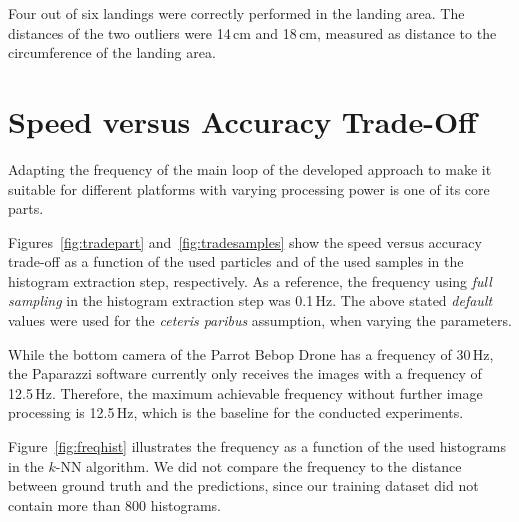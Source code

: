 \documentclass[11pt]{report}
\begin{document}


Four out of six landings were correctly performed in the landing
area. The distances of the two outliers were 14\,cm and 18\,cm,
measured as distance to the circumference of the landing area.
%

\section{Speed versus Accuracy Trade-Off}
\label{ref:speedvs}

Adapting the frequency of the main loop of the developed approach to
make it suitable for different platforms with varying processing power
is one of its core parts.

Figures~\ref{fig:tradepart} and~\ref{fig:tradesamples} show the speed
versus accuracy trade-off as a function of the used particles and of
the used samples in the histogram extraction step, respectively. As a
reference, the frequency using \emph{full sampling} in the histogram
extraction step was 0.1\,Hz. The above stated \emph{default} values
were used for the \emph{ceteris paribus} assumption, when varying the
parameters.

While the bottom camera of the Parrot Bebop Drone has a frequency of
30\,Hz, the Paparazzi software currently only receives the images with
a frequency of 12.5\,Hz. Therefore, the maximum achievable frequency
without further image processing is 12.5\,Hz, which is the baseline
for the conducted experiments.

Figure~\ref{fig:freqhist} illustrates the frequency as a function of
the used histograms in the $k$-NN algorithm. We did not compare the
frequency to the distance between ground truth and the predictions,
since our training dataset did not contain more than 800 histograms.
\end{document}
